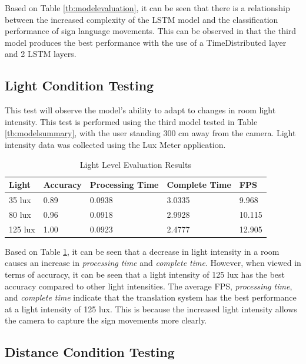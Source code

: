 Based on Table \ref{tb:modelevaluation}, it can be seen that there is a relationship between the increased complexity of the LSTM model and the classification performance of sign language movements. This can be observed in that the third model produces the best performance with the use of a TimeDistributed layer and 2 LSTM layers.

\subsection{Light Condition Testing}
\label{sec:lightanalysis}

This test will observe the model's ability to adapt to changes in room light intensity. This test is performed using the third model tested in Table \ref{tb:modelsummary}, with the user standing 300 cm away from the camera. Light intensity data was collected using the Lux Meter application.

\begin{table}[H]
  \caption{Light Level Evaluation Results}
  \label{tb:lightevaluation}
  \centering
  \begin{tabular}{lllll}
    \hline
    \textbf{Light} & \textbf{Accuracy} & \textbf{Processing Time} & \textbf{Complete Time} & \textbf{FPS} \\
    \hline
    35 lux & 0.89 & 0.0938 & 3.0335   & 9.968\\
    80 lux & 0.96 & 0.0918 & 2.9928   & 10.115\\
    125 lux & 1.00 & 0.0923 & 2.4777  & 12.905\\
    \hline
  \end{tabular}
\end{table}

Based on Table \ref{tb:lightevaluation}, it can be seen that a decrease in light intensity in a room causes an increase in \emph{processing time} and \emph{complete time}. However, when viewed in terms of accuracy, it can be seen that a light intensity of 125 lux has the best accuracy compared to other light intensities. The average FPS, \emph{processing time}, and \emph{complete time} indicate that the translation system has the best performance at a light intensity of 125 lux. This is because the increased light intensity allows the camera to capture the sign movements more clearly.

\subsection{Distance Condition Testing}
\label{sec:distanceanalysis}

